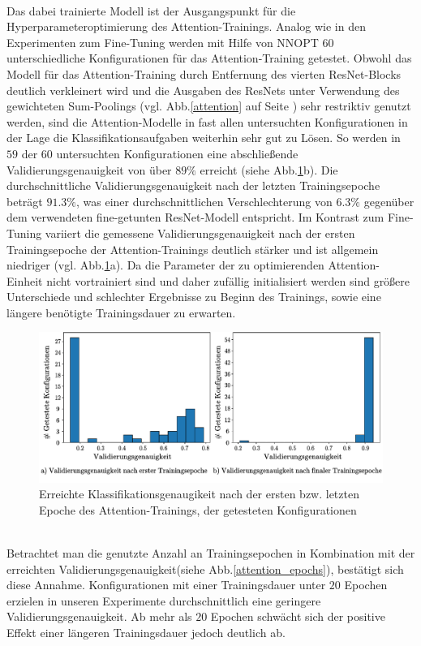 \\
Das dabei trainierte Modell ist der Ausgangspunkt für die Hyperparameteroptimierung des Attention-Trainings. Analog wie in den Experimenten zum Fine-Tuning werden mit Hilfe von NNOPT $60$ unterschiedliche Konfigurationen für das Attention-Training getestet. Obwohl das Modell für das Attention-Training durch Entfernung des vierten ResNet-Blocks deutlich verkleinert wird und die Ausgaben des ResNets unter Verwendung des gewichteten Sum-Poolings (vgl. Abb.\ref{attention} auf Seite \pageref{attention}) sehr restriktiv genutzt werden, sind die Attention-Modelle in fast allen untersuchten Konfigurationen in der Lage die Klassifikationsaufgaben weiterhin sehr gut zu Lösen. So werden in $59$ der $60$ untersuchten Konfigurationen eine abschließende Validierungsgenauigkeit von über $89\%$ erreicht (siehe Abb.\ref{attention_int_end}b). Die durchschnittliche Validierungsgenauigkeit nach der letzten Trainingsepoche beträgt $91.3\%$, was einer durchschnittlichen Verschlechterung von $6.3\%$ gegenüber dem verwendeten fine-getunten ResNet-Modell entspricht. Im Kontrast zum Fine-Tuning variiert die gemessene Validierungsgenauigkeit nach der ersten Trainingsepoche der Attention-Trainings deutlich stärker und ist allgemein niedriger (vgl. Abb.\ref{attention_int_end}a). Da die Parameter der zu optimierenden Attention-Einheit nicht vortrainiert sind und daher zufällig initialisiert werden sind größere Unterschiede und schlechter Ergebnisse zu Beginn des Trainings, sowie eine längere benötigte Trainingsdauer zu erwarten.
\begin{figure}[h]
\includegraphics[scale=0.75]{NNOPT/init_and_end_perf_attention.pdf}
\caption{Erreichte Klassifikationsgenaugikeit nach der ersten bzw. letzten Epoche des Attention-Trainings, der getesteten Konfigurationen}
\label{attention_int_end}
\end{figure}
\\
Betrachtet man die genutzte Anzahl an Trainingsepochen in Kombination mit der erreichten Validierungsgenauigkeit(siehe Abb.\ref{attention_epochs}), bestätigt sich diese Annahme. Konfigurationen mit einer Trainingsdauer unter $20$ Epochen erzielen in unseren Experimente durchschnittlich eine geringere Validierungsgenauigkeit. Ab mehr als $20$ Epochen schwächt sich der positive Effekt einer längeren Trainingsdauer jedoch deutlich ab.
